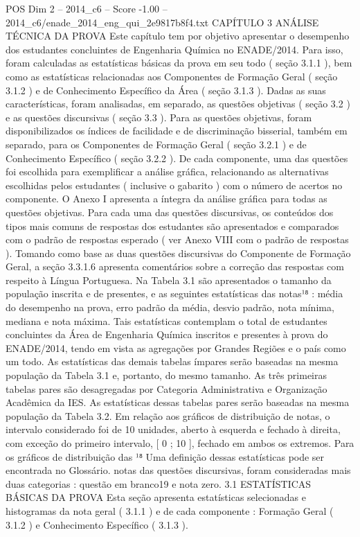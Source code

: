 \begin{textsample}{POS Dim 2 – 2014\_c6 – Score -1.00 – 2014\_c6/enade\_2014\_eng\_qui\_2e9817b8f4.txt}  \label{ex:f2_pos_231}
CAPÍTULO 3 ANÁLISE TÉCNICA DA PROVA Este capítulo tem por objetivo apresentar o desempenho dos estudantes concluintes de Engenharia Química no ENADE/2014.
Para isso, foram calculadas as estatísticas básicas da prova em seu todo ( seção 3.1.1 ), bem como as estatísticas relacionadas aos Componentes de Formação Geral ( seção 3.1.2 ) e de Conhecimento Específico da Área ( seção 3.1.3 ).
Dadas as suas características, foram analisadas, em separado, as questões objetivas ( seção 3.2 ) e as questões discursivas ( seção 3.3 ).
Para as questões objetivas, foram disponibilizados os índices de facilidade e de discriminação bisserial, também em separado, para os Componentes de Formação Geral ( seção 3.2.1 ) e de Conhecimento Específico ( seção 3.2.2 ).
De cada componente, uma das questões foi escolhida para exemplificar a análise gráfica, relacionando as alternativas escolhidas pelos estudantes ( inclusive o gabarito ) com o número de acertos no componente.
O Anexo I apresenta a íntegra da análise gráfica para todas as questões objetivas.
Para cada uma das questões discursivas, os conteúdos dos tipos mais comuns de respostas dos estudantes são apresentados e comparados com o padrão de respostas esperado ( ver Anexo VIII com o padrão de respostas ).
Tomando como base as duas questões discursivas do Componente de Formação Geral, a seção 3.3.1.6 apresenta comentários sobre a correção das respostas com respeito à Língua Portuguesa.
Na Tabela 3.1 são apresentados o tamanho da população inscrita e de presentes, e as seguintes estatísticas das notas¹⁸ : média do desempenho na prova, erro padrão da média, desvio padrão, nota mínima, mediana e nota máxima.
Tais estatísticas contemplam o total de estudantes concluintes da Área de Engenharia Química inscritos e presentes à prova do ENADE/2014, tendo em vista as agregações por Grandes Regiões e o país como um todo.
As estatísticas das demais tabelas ímpares serão baseadas na mesma população da Tabela 3.1 e, portanto, do mesmo tamanho.
As três primeiras tabelas pares são desagregadas por Categoria Administrativa e Organização Acadêmica da IES.
As estatísticas dessas tabelas pares serão baseadas na mesma população da Tabela 3.2.
Em relação aos gráficos de distribuição de notas, o intervalo considerado foi de 10 unidades, aberto à esquerda e fechado à direita, com exceção do primeiro intervalo, [ 0 ; 10 ], fechado em ambos os extremos.
Para os gráficos de distribuição das ¹⁸ Uma definição dessas estatísticas pode ser encontrada no Glossário. notas das questões discursivas, foram consideradas mais duas categorias : questão em branco19 e nota zero. 3.1 ESTATÍSTICAS BÁSICAS DA PROVA Esta seção apresenta estatísticas selecionadas e histogramas da nota geral ( 3.1.1 ) e de cada componente : Formação Geral ( 3.1.2 ) e Conhecimento Específico ( 3.1.3 ).

\end{textsample}
